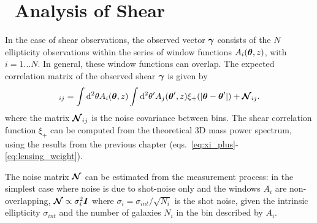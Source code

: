 \section{\KL\ Analysis of Shear}
\label{sec:KL_shear}
In the case of shear observations, the observed vector $\boldsymbol{\gamma}$
consists of the $N$ ellipticity observations within the series of window
functions $A_i(\boldsymbol{\theta}, z)$, with $i = 1...N$.  In general, these
window functions can overlap.  The expected correlation matrix of the
observed shear $\boldsymbol{\gamma}$ is given by
\begin{equation}
  [\mymat{\mathcal{C}_\gamma}]_{ij}
  = \int \dd^2\theta A_i(\myvec{\theta}, z)
  \int \dd^2\theta^\prime A_j(\myvec{\theta}^\prime, z)
  \xi_+(|\myvec{\theta} - \myvec{\theta}^\prime|) + \mymat{\mathcal{N}}_{ij}.
\end{equation}
where the matrix $\boldsymbol{\mathcal{N}}_{ij}$ is the noise covariance between
bins.  The shear correlation function $\xi_+$ can be computed from the
theoretical 3D mass power spectrum, using the results from the previous
chapter (eqs.~\ref{eq:xi_plus}-\ref{eq:lensing_weight}).

The noise matrix $\boldsymbol{\mathcal{N}}$ can be estimated from the measurement
process: in the simplest case where noise is due to shot-noise only and
the windows $A_i$ are non-overlapping,
$\boldsymbol{\mathcal{N}} \propto \sigma_i^2 \boldsymbol{I}$
where $\sigma_i = \sigma_{int} / \sqrt{N_i}$ is the shot noise, given
the intrinsic ellipticity $\sigma_{int}$ and the number of galaxies $N_i$
in the bin described by $A_i$.

